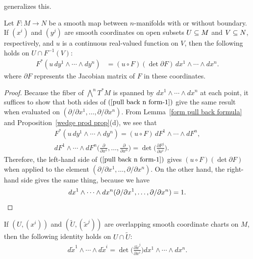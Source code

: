 generalizes this.
\begin{proposition}\label{pull back n form}
Let $F:M\to N$ be a smooth map between $n$-manifolds with or without boundary. If $(x^i)$ and $(y^j)$ are smooth coordinates on open subsets $U\subseteq M$ and $V\subseteq N$, respectively, and $u$ is a continuous real-valued function on $V$, then the following holds on $U\cap F^{-1}(V)$:
\begin{align}\label{pull back n form-1}
F^*(u\,dy^1\wedge\cdots\wedge dy^n)&=(u\circ F)(\det\partial F)\,dx^1\wedge\cdots\wedge dx^n.
\end{align}
where $\partial F$ represents the Jacobian matrix of $F$ in these coordinates.
\end{proposition}
\begin{proof}
Because the fiber of $\bigwedge^nT^*M$ is spanned by $dx^1\wedge\cdots\wedge dx^n$ at each point, it suffices to show that both sides of $(\ref{pull back n form-1})$ give the same result when evaluated on $(\partial/\partial x^1,\dots,\partial/\partial x^n)$. From Lemma~\ref{form pull back formula} and Proposition~\ref{wedge prod prop}(d), we see that
\begin{gather*}
F^*(u\,dy^1\wedge\cdots\wedge dy^n)=(u\circ F)\,dF^1\wedge\cdots\wedge dF^n,\\
dF^1\wedge\cdots\wedge dF^n\Big(\frac{\partial}{\partial x^1},\dots,\frac{\partial}{\partial x^n}\Big)=\det\Big(\frac{\partial F^j}{\partial x^i}\Big).
\end{gather*}
Therefore, the left-hand side of $(\ref{pull back n form-1})$ gives $(u\circ F)(\det\partial F)$ when applied to the element $(\partial/\partial x^1,\dots,\partial/\partial x^n)$. On the other hand, the right-hand side gives the same thing, because we have
\begin{equation*}
dx^1\wedge\cdots\wedge dx^n(\partial/\partial x^1,\dots,\partial/\partial x^n)=1.\qedhere
\end{equation*}
\end{proof}
\begin{corollary}
If $(U,(x^i))$ and $(\widetilde{U},(\widetilde{x}^j))$ are overlapping smooth coordinate charts on $M$, then the following identity holds on $U\cap\widetilde{U}$:
\begin{align}\label{form n transition}
d\widetilde{x}^1\wedge\cdots\wedge d\widetilde{x}^i=\det\Big(\frac{\partial\widetilde{x}^j}{\partial x^i}\Big)dx^1\wedge\cdots\wedge dx^n.
\end{align}
\end{corollary}
